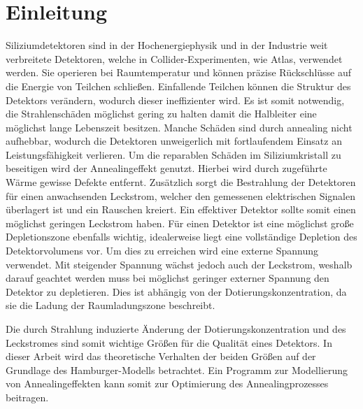 \chapter{Einleitung}
Siliziumdetektoren sind in der Hochenergiephysik und in der Industrie weit verbreitete
Detektoren, welche in Collider-Experimenten, wie Atlas, verwendet werden.
Sie operieren bei Raumtemperatur und können präzise Rückschlüsse auf die
Energie von Teilchen schließen. Einfallende Teilchen können die
Struktur des Detektors verändern, wodurch dieser ineffizienter wird.
Es ist somit notwendig, die Strahlenschäden möglichst gering zu halten damit
die Halbleiter eine möglichst lange Lebenszeit besitzen. Manche Schäden sind durch annealing nicht
aufhebbar, wodurch die Detektoren unweigerlich mit fortlaufendem Einsatz
an Leistungsfähigkeit verlieren. Um die reparablen Schäden im Siliziumkristall
zu beseitigen wird der Annealingeffekt genutzt. Hierbei wird durch zugeführte Wärme gewisse
Defekte entfernt.
Zusätzlich sorgt die Bestrahlung der Detektoren für einen anwachsenden Leckstrom, welcher den
gemessenen elektrischen Signalen überlagert ist und ein Rauschen kreiert. Ein
effektiver Detektor sollte somit einen möglichst geringen Leckstrom haben.
Für einen Detektor ist eine möglichst große Depletionszone ebenfalls wichtig, idealerweise
liegt eine vollständige Depletion des Detektorvolumens vor. Um dies zu erreichen wird
eine externe Spannung verwendet. Mit steigender Spannung wächst jedoch auch der Leckstrom, weshalb
darauf geachtet werden muss bei möglichst geringer externer Spannung den Detektor zu depletieren.
Dies ist abhängig von der Dotierungskonzentration, da sie die Ladung der
Raumladungszone beschreibt.

Die durch Strahlung induzierte Änderung der Dotierungskonzentration und des Leckstromes sind
somit wichtige Größen für die Qualität eines Detektors. In dieser Arbeit wird das
theoretische Verhalten der beiden Größen auf der Grundlage des Hamburger-Modells betrachtet.
Ein Programm zur Modellierung von Annealingeffekten kann somit zur
Optimierung des Annealingprozesses beitragen.


